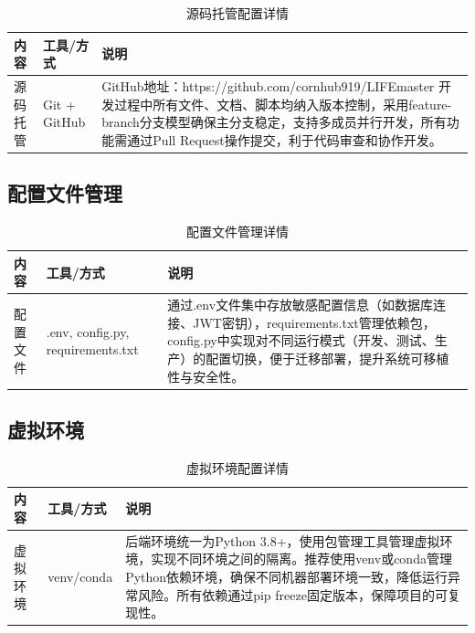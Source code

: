\documentclass[a4paper]{article}
\begin{document}
\begin{table}[H]
\centering
\caption{源码托管配置详情}
\begin{tabular}{|p{3cm}|p{4cm}|p{8cm}|}
\hline
\textbf{内容} & \textbf{工具/方式} & \textbf{说明} \\
\hline
源码托管 & Git + GitHub & GitHub地址：https://github.com/cornhub919/LIFEmaster 开发过程中所有文件、文档、脚本均纳入版本控制，采用feature-branch分支模型确保主分支稳定，支持多成员并行开发，所有功能需通过Pull Request操作提交，利于代码审查和协作开发。 \\
\hline
\end{tabular}
\end{table}

\subsection{配置文件管理}

\begin{table}[H]
\centering
\caption{配置文件管理详情}
\begin{tabular}{|p{3cm}|p{4cm}|p{8cm}|}
\hline
\textbf{内容} & \textbf{工具/方式} & \textbf{说明} \\
\hline
配置文件 & .env, config.py, requirements.txt & 通过.env文件集中存放敏感配置信息（如数据库连接、JWT密钥），requirements.txt管理依赖包，config.py中实现对不同运行模式（开发、测试、生产）的配置切换，便于迁移部署，提升系统可移植性与安全性。 \\
\hline
\end{tabular}
\end{table}

\subsection{虚拟环境}

\begin{table}[H]
\centering
\caption{虚拟环境配置详情}
\begin{tabular}{|p{3cm}|p{4cm}|p{8cm}|}
\hline
\textbf{内容} & \textbf{工具/方式} & \textbf{说明} \\
\hline
虚拟环境 & venv/conda & 后端环境统一为Python 3.8+，使用包管理工具管理虚拟环境，实现不同环境之间的隔离。推荐使用venv或conda管理Python依赖环境，确保不同机器部署环境一致，降低运行异常风险。所有依赖通过pip freeze固定版本，保障项目的可复现性。 \\
\hline
\end{tabular}
\end{table}
\end{document}
